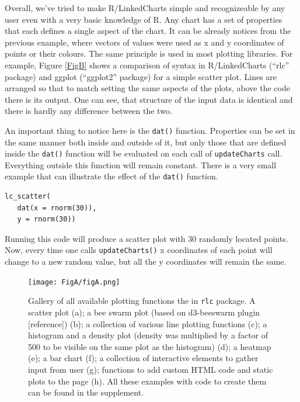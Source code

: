 \documentclass[twocolumn,10pt]{article}
\begin{document}
Overall, we've tried to make R/LinkedCharts simple and recognizeable by any user even with a very basic knowledge of R. Any chart has a set of properties that each defines a single aspect of the chart. It can be already notices from the previous example, where vectors of values were used as x and y coordinates of points or their colours. The same principle is used in most plotting libraries. For example, Figure \ref{FigB} shows a comparison of syntax in R/LinkedCharts (``rlc'' package) and ggplot (``ggplot2'' package) for a simple scatter plot. Lines are arranged so that to match setting the same aspects of the plots, above the code there is its output. One can see, that structure of the input data is identical and there is hardly any difference between the two.

An important thing to notice here is the \texttt{dat()} function. Properties can be set in the same manner both inside and outside of it, but only those that are defined inside the \texttt{dat()} function will be evaluated on each call of \texttt{updateCharts} call. Everything outside this function will remain constant. There is a very small example that can illustrate the effect of the \texttt{dat()} function.

\begin{verbatim}
lc_scatter(
   dat(x = rnorm(30)),
   y = rnorm(30))
\end{verbatim}

Running this code will produce a scatter plot with 30 randomly located points. Now, every time one calls \texttt{updateCharts()} x coordinates of each point will change to a new random value, but all the y coordinates will remain the same.

\begin{figure}
	\texttt{[image: FigA/figA.png]}
	\caption{Gallery of all available plotting functions the in \texttt{rlc} package. A scatter plot (a); a bee swarm plot (based on d3-beeswarm plugin [reference]) (b); a collection of various line plotting functions (c); a histogram and a density plot (density was multiplied by a factor of 500 to be visible on the same plot as the histogram) (d); a heatmap (e); a bar chart (f); a collection of interactive elements to gather input from user (g); functions to add custom HTML code and static plots to the page (h). All these examples with code to create them can be found in the supplement.}
	\label{FigA}
\end{figure}
\end{document}
